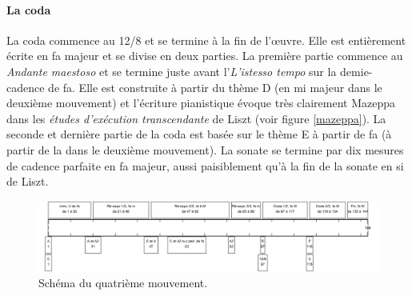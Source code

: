 \paragraph{La coda}

La coda commence au 12/8 et se termine à la fin de l'œuvre. Elle est entièrement écrite en fa majeur et se divise en deux parties. La première partie commence au \emph{Andante maestoso} et se termine juste avant l'\emph{L'istesso tempo} sur la demie-cadence de fa. Elle est construite à partir du thème D (en mi majeur dans le deuxième mouvement) et l'écriture pianistique évoque très clairement Mazeppa dans les \emph{études d'exécution transcendante} de Liszt (voir figure \ref{mazeppa}). La seconde et dernière partie de la coda est basée sur le thème E à partir de fa (à partir de la dans le deuxième mouvement). La sonate se termine par dix mesures de cadence parfaite en fa majeur, aussi paisiblement qu'à la fin de la sonate en si de Liszt.

\begin{figure}[!ht]
  \begin{bigcenter}
    \includegraphics[width=15cm, keepaspectratio]{frise-mvt4.png}
  \end{bigcenter}
  \caption{\label{schema-4}Schéma du quatrième mouvement.}
\end{figure}

